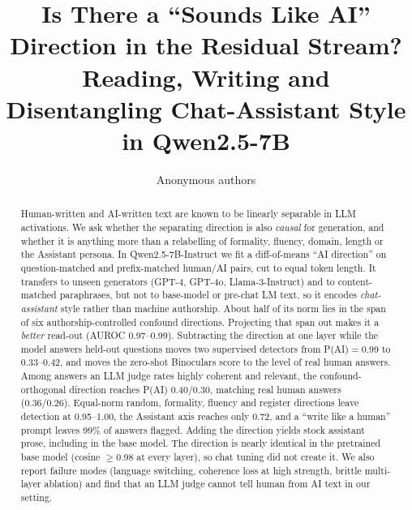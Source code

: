 \documentclass[10pt]{article}
\title{Is There a ``Sounds Like AI'' Direction in the Residual Stream?\\[2pt]
\large Reading, Writing and Disentangling Chat-Assistant Style in Qwen2.5-7B}
\author{Anonymous authors}
\date{}
\begin{document}
\maketitle

\begin{abstract}
Human-written and AI-written text are known to be linearly separable in LLM activations. We ask whether the separating direction is also \emph{causal} for generation, and whether it is anything more than a relabelling of formality, fluency, domain, length or the Assistant persona. In Qwen2.5-7B-Instruct we fit a diff-of-means ``AI direction'' on question-matched and prefix-matched human/AI pairs, cut to equal token length. It transfers to unseen generators (GPT-4, GPT-4o, Llama-3-Instruct) and to content-matched paraphrases, but not to base-model or pre-chat LM text, so it encodes \emph{chat-assistant} style rather than machine authorship. About half of its norm lies in the span of six authorship-controlled confound directions. Projecting that span out makes it a \emph{better} read-out (AUROC 0.97--0.99). Subtracting the direction at one layer while the model answers held-out questions moves two supervised detectors from P(AI)$=$0.99 to 0.33--0.42, and moves the zero-shot Binoculars score to the level of real human answers. Among answers an LLM judge rates highly coherent and relevant, the confound-orthogonal direction reaches P(AI) 0.40/0.30, matching real human answers (0.36/0.26). Equal-norm random, formality, fluency and register directions leave detection at 0.95--1.00, the Assistant axis reaches only 0.72, and a ``write like a human'' prompt leaves 99\% of answers flagged. Adding the direction yields stock assistant prose, including in the base model. The direction is nearly identical in the pretrained base model (cosine $\geq$0.98 at every layer), so chat tuning did not create it. We also report failure modes (language switching, coherence loss at high strength, brittle multi-layer ablation) and find that an LLM judge cannot tell human from AI text in our setting.
\end{abstract}











\end{document}
